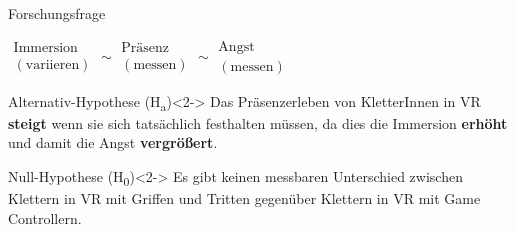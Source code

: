 \documentclass[11pt,aspectratio=169,
xcolor={table},
hyperref={
hidelinks,
pdfauthor={Peter Schulz},
pdftitle={Infromatik am Abgrund - Klettern in Virtueller Realität},
pdfsubject={Master Thesis},
pdfkeywords={Sport Climbing;Virtual Reality;Mixed Reality;Passive Haptics;Presence},
pdfencoding=auto},
url={obeyspaces,spaces,hyphens}]{beamer}
\theoremstyle{plain}
\newcommand{\backupend}{
	\addtocounter{framenumberappendix}{-\value{framenumber}}
	\addtocounter{framenumber}{\value{framenumberappendix}} 
}
\begin{document}
\begin{frame}{Forschungsfrage}
\begin{center}
\LARGE
$\substack{\text{Immersion}\\(\text{variieren})} \sim \substack{\text{Präsenz}\\(\text{messen})} \sim \substack{\text{Angst}\\(\text{messen})}$
\end{center}
\begin{center}
\begin{minipage}{0.7\textwidth}
	\begin{block}{Alternativ-Hypothese (H\textsubscript{a}\label{hyp:anxiety})}<2->
		Das \textcolor{tertiary}{Präsenz}erleben von KletterInnen in \gls{VR} \textbf{steigt} wenn sie sich tatsächlich festhalten müssen, da dies die \textcolor{tertiary}{Immersion} \textbf{erhöht} und damit die \textcolor{tertiary}{Angst} \textbf{vergrößert}.
	\end{block}
	\begin{block}{Null-Hypothese (H\textsubscript{0}\label{hyp:anxiety})}<2->
		Es gibt keinen messbaren Unterschied zwischen Klettern in \gls{VR} mit \textcolor{tertiary}{Griffen und Tritten} gegenüber Klettern in \gls{VR} mit \textcolor{tertiary}{Game Controllern}.
	\end{block}
\end{minipage}
\end{center}
\end{frame}

\backupend
	
\end{document}
